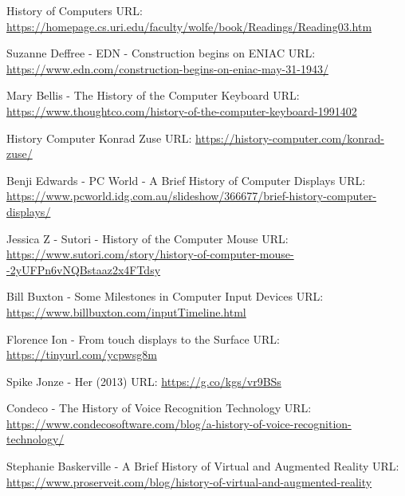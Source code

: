 \documentclass{article}
\begin{document}
 \newpage
 \begin{thebibliography}{00}
    
 History of Computers
\newline
URL: \url{https://homepage.cs.uri.edu/faculty/wolfe/book/Readings/Reading03.htm}

 Suzanne Deffree - EDN - Construction begins on ENIAC
\newline
URL: \url{https://www.edn.com/construction-begins-on-eniac-may-31-1943/}

 Mary Bellis - The History of the Computer Keyboard
\newline
URL: \url{https://www.thoughtco.com/history-of-the-computer-keyboard-1991402}

 History Computer Konrad Zuse
\newline
URL: \url{https://history-computer.com/konrad-zuse/}

 Benji Edwards - PC World - A Brief History of Computer Displays
\newline
URL: \url{https://www.pcworld.idg.com.au/slideshow/366677/brief-history-computer-displays/}

 Jessica Z - Sutori - History of the Computer Mouse
\newline
URL: \url{https://www.sutori.com/story/history-of-computer-mouse--2yUFPn6vNQBstaaz2x4FTdsy}

 Bill Buxton - Some Milestones in Computer Input Devices
\newline
URL: \url{https://www.billbuxton.com/inputTimeline.html}

 Florence Ion - From touch displays to the Surface
\newline
URL: \url{https://tinyurl.com/ycpwsg8m}

 Spike Jonze - Her (2013)
\newline
URL: \url{https://g.co/kgs/vr9BSs}

 Condeco - The History of Voice Recognition Technology
\newline
URL: \url{https://www.condecosoftware.com/blog/a-history-of-voice-recognition-technology/}

  Stephanie Baskerville - A Brief History of Virtual and Augmented Reality
\newline
URL: \url{https://www.proserveit.com/blog/history-of-virtual-and-augmented-reality}

\end{thebibliography}

\end{document}
